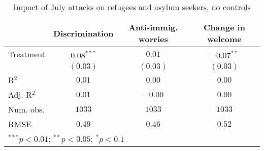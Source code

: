 
\begin{table}
\caption{Impact of July attacks on refugees and asylum seekers, no controls}
\begin{center}
\begin{tabular}{l c c c}
\toprule
 & Discrimination & Anti-immig. worries & Change in welcome \\
\midrule
Treatment  & $0.08^{***}$ & $0.01$   & $-0.07^{**}$ \\
           & $(0.03)$     & $(0.03)$ & $(0.03)$     \\
\midrule
R$^2$      & $0.01$       & $0.00$   & $0.00$       \\
Adj. R$^2$ & $0.01$       & $-0.00$  & $0.00$       \\
Num. obs.  & $1033$       & $1033$   & $1033$       \\
RMSE       & $0.49$       & $0.46$   & $0.52$       \\
\bottomrule
\multicolumn{4}{l}{\scriptsize{$^{***}p<0.01$; $^{**}p<0.05$; $^{*}p<0.1$}}
\end{tabular}
\label{tab_host_no_controls}
\end{center}
\end{table}
